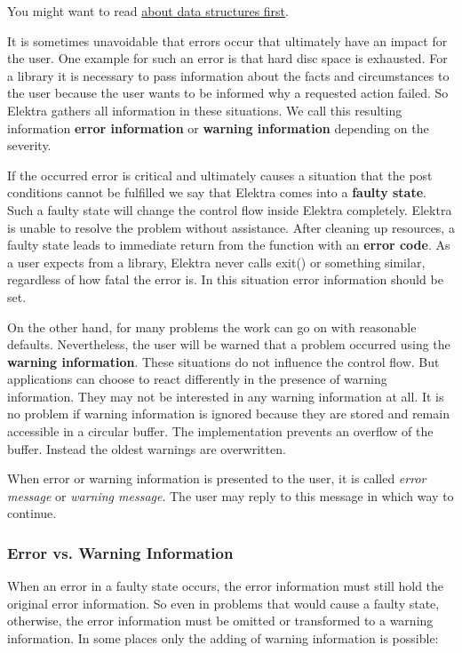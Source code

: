 You might want to read \hyperlink{md_doc_help_elektra-data-structures_doc_help_elektra-data-structures_md}{about data structures first}.

It is sometimes unavoidable that errors occur that ultimately have an impact for the user. One example for such an error is that hard disc space is exhausted. For a library it is necessary to pass information about the facts and circumstances to the user because the user wants to be informed why a requested action failed. So Elektra gathers all information in these situations. We call this resulting information {\bfseries error information} or {\bfseries warning information} depending on the severity.

If the occurred error is critical and ultimately causes a situation that the post conditions cannot be fulfilled we say that Elektra comes into a {\bfseries faulty state}. Such a faulty state will change the control flow inside Elektra completely. Elektra is unable to resolve the problem without assistance. After cleaning up resources, a faulty state leads to immediate return from the function with an {\bfseries error code}. As a user expects from a library, Elektra never calls {\ttfamily exit()} or something similar, regardless of how fatal the error is. In this situation error information should be set.

On the other hand, for many problems the work can go on with reasonable defaults. Nevertheless, the user will be warned that a problem occurred using the {\bfseries warning information}. These situations do not influence the control flow. But applications can choose to react differently in the presence of warning information. They may not be interested in any warning information at all. It is no problem if warning information is ignored because they are stored and remain accessible in a circular buffer. The implementation prevents an overflow of the buffer. Instead the oldest warnings are overwritten.

When error or warning information is presented to the user, it is called {\itshape error message} or {\itshape warning message}. The user may reply to this message in which way to continue.

\subsubsection*{Error vs. Warning Information}

When an error in a faulty state occurs, the error information must still hold the original error information. So even in problems that would cause a faulty state, otherwise, the error information must be omitted or transformed to a warning information. In some places only the adding of warning information is possible\+:


